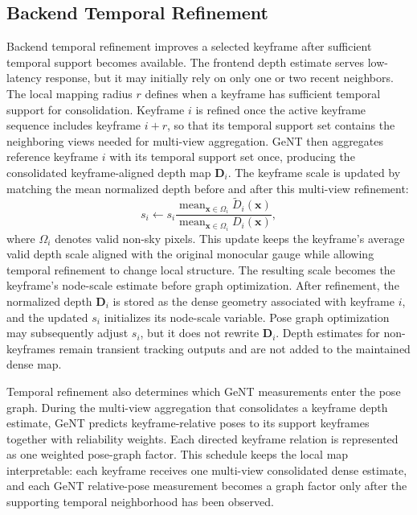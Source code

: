 \subsection{Backend Temporal Refinement}
Backend temporal refinement improves a selected keyframe after sufficient temporal support becomes available.
The frontend depth estimate serves low-latency response, but it may initially rely on only one or two recent neighbors.
The local mapping radius $r$ defines when a keyframe has sufficient temporal support for consolidation.
Keyframe $i$ is refined once the active keyframe sequence includes keyframe $i+r$, so that its temporal support set contains the neighboring views needed for multi-view aggregation.
GeNT then aggregates reference keyframe $i$ with its temporal support set once, producing the consolidated keyframe-aligned depth map $\bm{D}_i$.
The keyframe scale is updated by matching the mean normalized depth before and after this multi-view refinement:
\begin{equation}
    s_i \leftarrow
    s_i
    \frac{
        \operatorname{mean}_{\bm{x}\in\Omega_i}\tilde{D}_i(\bm{x})
    }{
        \operatorname{mean}_{\bm{x}\in\Omega_i}D_i(\bm{x})
    },
    \label{eq:geont_temporal_scale_update}
\end{equation}
where $\Omega_i$ denotes valid non-sky pixels.
This update keeps the keyframe's average valid depth scale aligned with the original monocular gauge while allowing temporal refinement to change local structure.
The resulting scale becomes the keyframe's node-scale estimate before graph optimization.
After refinement, the normalized depth $\bm{D}_i$ is stored as the dense geometry associated with keyframe $i$, and the updated $s_i$ initializes its node-scale variable.
Pose graph optimization may subsequently adjust $s_i$, but it does not rewrite $\bm{D}_i$.
Depth estimates for non-keyframes remain transient tracking outputs and are not added to the maintained dense map.

Temporal refinement also determines which GeNT measurements enter the pose graph.
During the multi-view aggregation that consolidates a keyframe depth estimate, GeNT predicts keyframe-relative poses to its support keyframes together with reliability weights.
Each directed keyframe relation is represented as one weighted pose-graph factor.
This schedule keeps the local map interpretable: each keyframe receives one multi-view consolidated dense estimate, and each GeNT relative-pose measurement becomes a graph factor only after the supporting temporal neighborhood has been observed.

